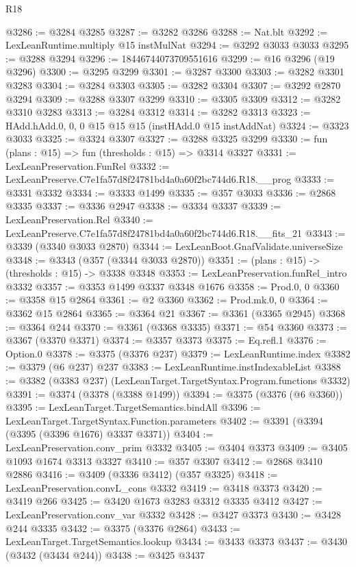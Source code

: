 \begin{lexlean}{R18}
\begin{coremodule}
{{{{{{{{{{{{{{{{{{{@3286 := @3284 @3285
@3287 := @3282 @3286
@3288 := Nat.blt
@3292 := LexLeanRuntime.multiply @15 instMulNat
@3294 := @3292 @3033 @3033
@3295 := @3288 @3294
@3296 := 18446744073709551616
@3299 := @16 @3296 (@19 @3296)
@3300 := @3295 @3299
@3301 := @3287 @3300
@3303 := @3282 @3301 @3283
@3304 := @3284 @3303
@3305 := @3282 @3304
@3307 := @3292 @2870 @3294
@3309 := @3288 @3307 @3299
@3310 := @3305 @3309
@3312 := @3282 @3310 @3283
@3313 := @3284 @3312
@3314 := @3282 @3313
@3323 := HAdd.hAdd.{0, 0, 0} @15 @15 @15 (instHAdd.{0} @15 instAddNat)
@3324 := @3323 @3033
@3325 := @3324 @3307
@3327 := @3288 @3325 @3299
@3330 := fun (plans : @15) => fun (thresholds : @15) => @3314 @3327
@3331 := LexLeanPreservation.FunRel
@3332 := LexLeanPreserve.C7e1fa57d8f24781bd4a0a60f2bc744d6.R18.__prog
@3333 := @3331 @3332
@3334 := @3333 @1499
@3335 := @357 @3033
@3336 := @2868 @3335
@3337 := @3336 @2947
@3338 := @3334 @3337
@3339 := LexLeanPreservation.Rel
@3340 := LexLeanPreserve.C7e1fa57d8f24781bd4a0a60f2bc744d6.R18.__fits_21
@3343 := @3339 (@3340 @3033 @2870)
@3344 := LexLeanBoot.GnafValidate.universeSize
@3348 := @3343 (@357 (@3344 @3033 @2870))
@3351 := (plans : @15) -> (thresholds : @15) -> @3338 @3348
@3353 := LexLeanPreservation.funRel_intro @3332
@3357 := @3353 @1499 @3337 @3348 @1676
@3358 := Prod.{0, 0}
@3360 := @3358 @15 @2864
@3361 := @2 @3360
@3362 := Prod.mk.{0, 0}
@3364 := @3362 @15 @2864
@3365 := @3364 @21
@3367 := @3361 (@3365 @2945)
@3368 := @3364 @244
@3370 := @3361 (@3368 @3335)
@3371 := @54 @3360
@3373 := @3367 (@3370 @3371)
@3374 := @3357 @3373
@3375 := Eq.refl.{1}
@3376 := Option.{0}
@3378 := @3375 (@3376 @237)
@3379 := LexLeanRuntime.index
@3382 := @3379 (@6 @237) @237
@3383 := LexLeanRuntime.instIndexableList
@3388 := @3382 (@3383 @237) (LexLeanTarget.TargetSyntax.Program.functions @3332)
@3391 := @3374 (@3378 (@3388 @1499))
@3394 := @3375 (@3376 (@6 @3360))
@3395 := LexLeanTarget.TargetSemantics.bindAll
@3396 := LexLeanTarget.TargetSyntax.Function.parameters
@3402 := @3391 (@3394 (@3395 (@3396 @1676) @3337 @3371))
@3404 := LexLeanPreservation.conv_prim @3332
@3405 := @3404 @3373
@3409 := @3405 @1093 @1674 @3313 @3327
@3410 := @357 @3307
@3412 := @2868 @3410 @2886
@3416 := @3409 (@3336 @3412) (@357 @3325)
@3418 := LexLeanPreservation.convL_cons @3332
@3419 := @3418 @3373
@3420 := @3419 @266
@3425 := @3420 @1673 @3283 @3312 @3335 @3412
@3427 := LexLeanPreservation.conv_var @3332
@3428 := @3427 @3373
@3430 := @3428 @244 @3335
@3432 := @3375 (@3376 @2864)
@3433 := LexLeanTarget.TargetSemantics.lookup
@3434 := @3433 @3373
@3437 := @3430 (@3432 (@3434 @244))
@3438 := @3425 @3437
}}}}}}}}}}}}}}}}}}}
\end{coremodule}
\end{lexlean}
